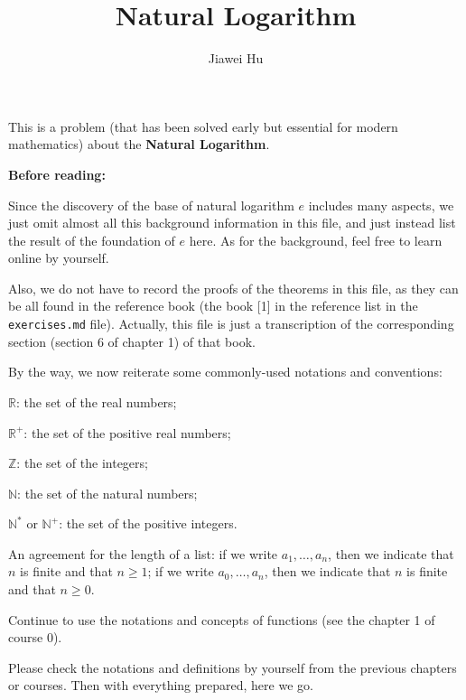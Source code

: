 \documentclass{article}
\title{\LARGE \textbf{Natural Logarithm}}
\author{\large Jiawei Hu}
\begin{document}
\maketitle

This is a problem (that has been solved early but essential for modern mathematics) about the \textbf{Natural Logarithm}. 

\begin{Rmk}{}
    \textbf{Before reading:}
    \begin{compactenum}
        \item Since the discovery of the base of natural logarithm $e$ includes many aspects, we just omit almost all this background information in this file, and just instead list the result of the foundation of $e$ here. As for the background, feel free to learn online by yourself.
        \item Also, we do not have to record the proofs of the theorems in this file, as they can be all found in the reference book (the book [1] in the reference list in the \verb|exercises.md| file). Actually, this file is just a transcription of the corresponding section (section 6 of chapter 1) of that book.
    \end{compactenum}
\end{Rmk}

By the way, we now reiterate some commonly-used notations and conventions:
\begin{compactenum}
    \item $\mathbb{R}$: the set of the real numbers;
    \item $\mathbb{R}^+$: the set of the positive real numbers;
    \item $\mathbb{Z}$: the set of the integers;
    \item $\mathbb{N}$: the set of the natural numbers;
    \item $\mathbb{N^\ast}$ or $\mathbb{N}^+$: the set of the positive integers.
    \item An agreement for the length of a list: if we write $a_1, \dots, a_n$, then we indicate that $n$ is finite and that $n\geq 1$; if we write $a_0, \dots, a_n$, then we indicate that $n$ is finite and that $n\geq 0$.
    \item Continue to use the notations and concepts of functions (see the chapter 1 of course 0).
\end{compactenum} 
Please check the notations and definitions by yourself from the previous chapters or courses. Then with everything prepared, here we go.
\end{document}
